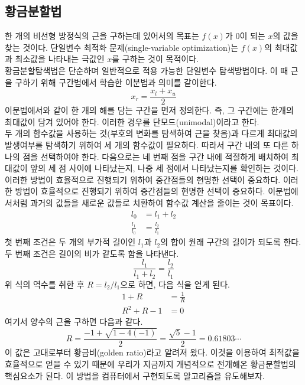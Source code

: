 \subsection{황금분할법}
한 개의 비선형 방정식의 근을 구하는데 있어서의 목표는 $f(x)$가 0이 되는 $x$의 값을 찾는 것이다. 단일변수 최적화 문제(single-variable optimization)는 $f(x)$의 최대값과 최소값을 나타내는 극값인 $x$를 구하는 것이 목적이다.\\
황금분할탐색법은 단순하며 일반적으로 적용 가능한 단일변수 탐색방법이다. 이 때 근을 구하기 위해 구간법에서 학습한 이분법과 의미를 같이한다. 
\begin{equation*}
x_{r}=\frac{x_{l}+x_{u}}{2}
\end{equation*}
이분법에서와 같이 한 개의 해를 담는 구간을 먼저 정의한다. 즉, 그 구간에는 한개의 최대값이 담겨 있어야 한다. 이러한 경우를 단모드(unimodal)이라고 한다.\\
두 개의 함수값을 사용하는 것(부호의 변화를 탐색하여 근을 찾음)과 다르게 최대값의 발생여부를 탐색하기 위하여 세 개의 함수값이 필요하다. 따라서 구간 내의 또 다른 하나의 점을 선택하여야 한다. 다음으로는 네 번째 점을 구간 내에 적절하게 배치하여 최대값이 앞의 세 점 사이에 나타났는지, 나중 세 점에서 나타났는지를 확인하는 것이다. 이러한 방법이 효율적으로 진행되기 위하여 중간점들의 현명한 선택이 중요하다. 이러한 방법이 효율적으로 진행되기 위하여 중간점들의 현명한 선택이 중요하다. 이분법에서처럼 과거의 값들을 새로운 값들로 치환하여 함수값 계산을 줄이는 것이 목표이다.
\begin{align}
l_{0}&=l_{1}+l_{2}\\
\frac{l_{1}}{l_{0}}&=\frac{l_{2}}{l_{1}}
\end{align}
첫 번째 조건은 두 개의 부가적 길이인 $l_{1}$과 $l_{2}$의 합이 원래 구간의 길이가 되도록 한다. 두 번째 조건은 길이의 비가 같도록 함을 나타낸다.
\begin{equation}
\frac{l_{1}}{l_{1}+l_{2}}=\frac{l_{2}}{l_{1}}
\end{equation}
위 식의 역수를 취한 후 $R=l_{2}/l_{1}$으로 하면, 다음 식을 얻게 된다.
\begin{align}
1+R&=\frac{1}{R}\\
R^{2}+R-1&=0
\end{align}
여기서 양수의 근을 구하면 다음과 같다.
\begin{equation}
R=\frac{-1+\sqrt{1-4(-1)}}{2}=\frac{\sqrt{5}-1}{2}=0.61803\cdots
\end{equation}
이 값은 고대로부터 황금비(golden ratio)라고 알려져 왔다. 이것을 이용하여 최적값을 효율적으로 얻을 수 있기 때문에 우리가 지금까지 개념적으로 전개해온 황금분할법의 핵심요소가 된다. 이 방법을 컴퓨터에서 구현되도록 알고리즘을 유도해보자.

